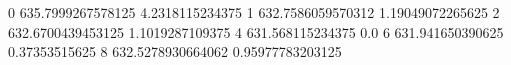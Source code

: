 0 635.7999267578125 4.2318115234375
1 632.7586059570312 1.19049072265625
2 632.6700439453125 1.1019287109375
4 631.568115234375 0.0
6 631.941650390625 0.37353515625
8 632.5278930664062 0.95977783203125
